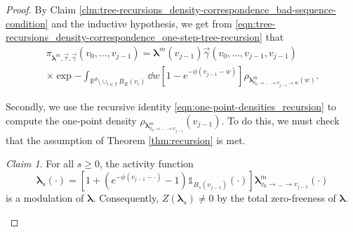 \documentclass[11pt]{article}
\newcommand{\R}{\mathbb R}
\newcommand{\bl}{\bm{\lambda}}
\newcommand{\hcconst}{R}
\newcommand{\indicator}[1]{\mathds{1}_{#1}}
\numberwithin{equation}{section}
\theoremstyle{plain}
\theoremstyle{definition}
\theoremstyle{remark}
\newtheorem{claim}[theorem]{Claim}
\begin{document}
\begin{proof}
By Claim \ref{clm:tree-recursions_density-correspondence_bad-sequence-condition} and the inductive hypothesis, we get from \eqref{eqn:tree-recursions_density-correspondence_one-step-tree-recursion} that 
\begin{equation}
\label{eqn:tree-recursions_density-correspondence_first-rewriting}
\begin{multlined}
\pi_{\bl^{m},\vec{\tau},\vec{\gamma}}(v_{0},\dots,v_{j-1})=
\bl^{m}(v_{j-1})\vec{\gamma}(v_{0},\dots,v_{j-1},v_{j-1})
\\
\times\exp{-\int_{\R^{d}\setminus\cup_{i\in I}B_{\hcconst}(v_{i})}\dd{w}\left[1-e^{-\phi(v_{j-1}-w)}\right]\rho_{\bl^{m}_{v_{0}\rightarrow\dots\rightarrow v_{j-1}\rightarrow w}(w)}}.
\end{multlined}
\end{equation}

Secondly, we use the recursive identity \eqref{eqn:one-point-densities_recursion} to compute the one-point density $\rho_{\bl^{m}_{v_{0}\rightarrow\dots\rightarrow v_{j-1}}}(v_{j-1})$.
To do this, we must check that the assumption of Theorem \ref{thm:recursion} is met.

\begin{claim}
\label{clm:tree-recursions_density-correspondence_interpolation}
For all $s\ge 0$, the activity function 
\begin{equation}
\label{eqn:tree-recursions_density-correspondence_interpolation}
\bl_{s}(\cdot)=\left[1+(e^{-\phi(v_{j-1}-\cdot)}-1)\indicator{B_{s}(v_{j-1})}(\cdot)\right]\bl^{m}_{v_{0}\rightarrow\dots\rightarrow v_{j-1}}(\cdot)
\end{equation}
is a modulation of $\bl$.
Consequently, $Z(\bl_{s})\ne 0$ by the total zero-freeness of $\bl$.
\end{claim}


\end{proof}
\end{document}

